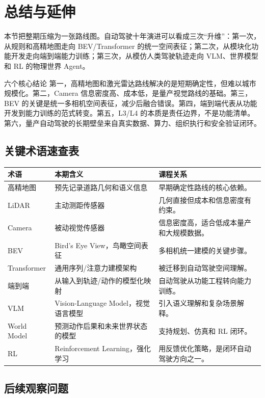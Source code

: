 \section{总结与延伸}

本节把整期压缩为一张路线图。自动驾驶十年演进可以看成三次“升维”：第一次，从规则和高精地图走向 BEV/Transformer 的统一空间表征；第二次，从模块化功能开发走向端到端能力训练；第三次，从模仿人类驾驶轨迹走向 VLM、世界模型和 RL 的物理世界 Agent。

\begin{importantbox}{六个核心结论}
第一，高精地图和激光雷达路线解决的是短期确定性，但难以城市规模化。第二，Camera 信息密度高、成本低，是量产视觉路线的基础。第三，BEV 的关键是统一多相机空间表征，减少后融合错误。第四，端到端代表从功能开发到能力训练的范式转变。第五，L3/L4 的本质是责任边界，不是功能清单。第六，量产自动驾驶的长期壁垒来自真实数据、算力、组织执行和安全验证闭环。
\end{importantbox}

\subsection{关键术语速查表}

\noindent\begin{tabularx}{\textwidth}{p{}p{}X}
\toprule
术语 & 本期含义 & 课程关系 \\
\midrule
高精地图 & 预先记录道路几何和语义信息 & 早期确定性路线的核心依赖。 \\
LiDAR & 主动测距传感器 & 几何直接但成本和信息密度有约束。 \\
Camera & 被动视觉传感器 & 信息密度高，适合低成本量产和大规模数据。 \\
BEV & Bird's Eye View，鸟瞰空间表征 & 多相机统一建模的关键步骤。 \\
Transformer & 通用序列/注意力建模架构 & 被迁移到自动驾驶空间理解。 \\
端到端 & 从输入到轨迹/动作的模型化映射 & 自动驾驶从功能工程转向能力训练。 \\
VLM & Vision-Language Model，视觉语言模型 & 引入语义理解和复杂场景解释。 \\
World Model & 预测动作后果和未来世界状态的模型 & 支持规划、仿真和 RL 闭环。 \\
RL & Reinforcement Learning，强化学习 & 用反馈优化策略，是闭环自动驾驶方向之一。 \\
\bottomrule
\end{tabularx}

\subsection{后续观察问题}

